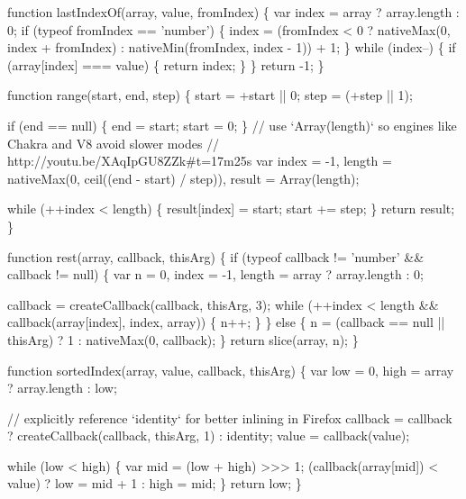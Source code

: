\begin{DoxyCodeInclude}
{{  \textcolor{keyword}{function} lastIndexOf(array, value, fromIndex) \{
    var index = array ? array.length : 0;
    \textcolor{keywordflow}{if} (typeof fromIndex == \textcolor{stringliteral}{'number'}) \{
      index = (fromIndex < 0 ? nativeMax(0, index + fromIndex) : nativeMin(fromIndex, index - 1)) + 1;
    \}
    \textcolor{keywordflow}{while} (index--) \{
      \textcolor{keywordflow}{if} (array[index] === value) \{
        \textcolor{keywordflow}{return} index;
      \}
    \}
    \textcolor{keywordflow}{return} -1;
  \}

  \textcolor{keyword}{function} range(start, end, step) \{
    start = +start || 0;
    step =  (+step || 1);

    \textcolor{keywordflow}{if} (end == null) \{
      end = start;
      start = 0;
    \}
    \textcolor{comment}{// use `Array(length)` so engines like Chakra and V8 avoid slower modes}
    \textcolor{comment}{// http://youtu.be/XAqIpGU8ZZk#t=17m25s}
    var index = -1,
        length = nativeMax(0, ceil((end - start) / step)),
        result = Array(length);

    \textcolor{keywordflow}{while} (++index < length) \{
      result[index] = start;
      start += step;
    \}
    \textcolor{keywordflow}{return} result;
  \}

  \textcolor{keyword}{function} rest(array, callback, thisArg) \{
    \textcolor{keywordflow}{if} (typeof callback != \textcolor{stringliteral}{'number'} && callback != null) \{
      var n = 0,
          index = -1,
          length = array ? array.length : 0;

      callback = createCallback(callback, thisArg, 3);
      \textcolor{keywordflow}{while} (++index < length && callback(array[index], index, array)) \{
        n++;
      \}
    \} \textcolor{keywordflow}{else} \{
      n = (callback == null || thisArg) ? 1 : nativeMax(0, callback);
    \}
    \textcolor{keywordflow}{return} slice(array, n);
  \}

  \textcolor{keyword}{function} sortedIndex(array, value, callback, thisArg) \{
    var low = 0,
        high = array ? array.length : low;

    \textcolor{comment}{// explicitly reference `identity` for better inlining in Firefox}
    callback = callback ? createCallback(callback, thisArg, 1) : identity;
    value = callback(value);

    \textcolor{keywordflow}{while} (low < high) \{
      var mid = (low + high) >>> 1;
      (callback(array[mid]) < value)
        ? low = mid + 1
        : high = mid;
    \}
    \textcolor{keywordflow}{return} low;
  \}

}}
\end{DoxyCodeInclude}
